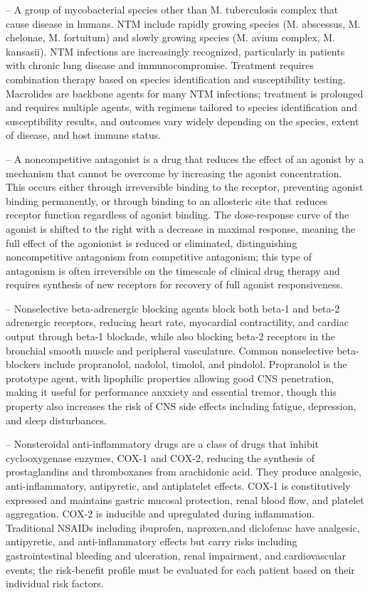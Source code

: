 -- A group of mycobacterial species other than M. tuberculosis complex that cause disease in humans. NTM include rapidly growing species (M. abscessus, M. chelonae, M. fortuitum) and slowly growing species (M. avium complex, M. kansasii). NTM infections are increasingly recognized, particularly in patients with chronic lung disease and immunocompromise. Treatment requires combination therapy based on species identification and susceptibility testing. Macrolides are backbone agents for many NTM infections; treatment is prolonged and requires multiple agents, with regimens tailored to species identification and susceptibility results, and outcomes vary widely depending on the species, extent of disease, and host immune status.

-- A noncompetitive antagonist is a drug that reduces the effect of an agonist by a mechanism that cannot be overcome by increasing the agonist concentration. This occurs either through irreversible binding to the receptor, preventing agonist binding permanently, or through binding to an allosteric site that reduces receptor function regardless of agonist binding. The dose-response curve of the agonist is shifted to the right with a decrease in maximal response, meaning the full effect of the agonionist is reduced or eliminated, distinguishing noncompetitive antagonism from competitive antagonism; this type of antagonism is often irreversible on the timescale of clinical drug therapy and requires synthesis of new receptors for recovery of full agonist responsiveness.

-- Nonselective beta-adrenergic blocking agents block both beta-1 and beta-2 adrenergic receptors, reducing heart rate, myocardial contractility, and cardiac output through beta-1 blockade, while also blocking beta-2 receptors in the bronchial smooth muscle and peripheral vasculature. Common nonselective beta-blockers include propranolol, nadolol, timolol, and pindolol. Propranolol is the prototype agent, with lipophilic properties allowing good CNS penetration, making it useful for performance anxxiety and essential tremor, though this property also increases the risk of CNS side effects including fatigue, depression, and sleep disturbances.

-- Nonsteroidal anti-inflammatory drugs are a class of drugs that inhibit cyclooxygenase enzymes, COX-1 and COX-2, reducing the synthesis of prostaglandins and thromboxanes from arachidonic acid. They produce analgesic, anti-inflammatory, antipyretic, and antiplatelet effects. COX-1 is constitutively expressed and maintains gastric mucosal protection, renal blood flow, and platelet aggregation. COX-2 is inducible and upregulated during inflammation. Traditional NSAIDs including ibuprofen, naproxen,and diclofenac have analgesic, antipyretic, and anti-inflammatory effects but carry risks including gastrointestinal bleeding and ulceration, renal impairment, and cardiovascular events; the risk-benefit profile must be evaluated for each patient based on their individual risk factors.

